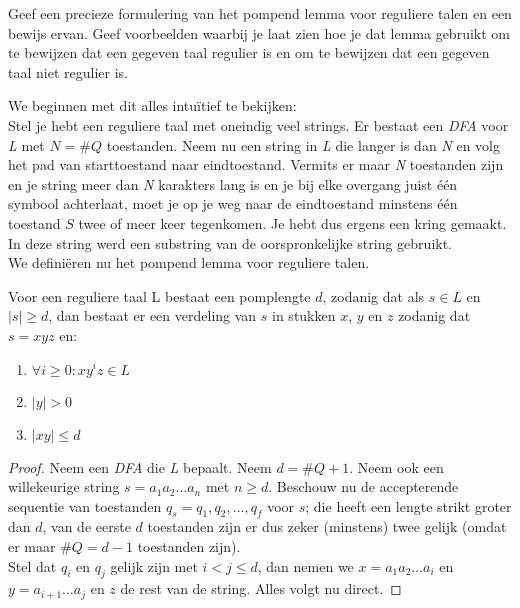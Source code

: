 \begin{quest}
Geef een precieze formulering van het pompend lemma voor reguliere talen en een bewijs ervan. Geef voorbeelden waarbij je laat zien hoe je dat lemma gebruikt om te bewijzen dat een gegeven taal regulier is en om te bewijzen dat een gegeven taal niet regulier is.
\end{quest}

We beginnen met dit alles intu\"itief te bekijken:\\
Stel je hebt een reguliere taal met oneindig veel strings. Er bestaat een \emph{DFA} voor \emph{L} met $N = \#Q$ toestanden. Neem nu een string in \emph{L} die langer is dan \emph{N} en volg het pad van starttoestand naar eindtoestand. Vermits er maar \emph{N} toestanden zijn en je string meer dan \emph{N} karakters lang is en je bij elke overgang juist \'e\'en symbool achterlaat, moet je op je weg naar de eindtoestand minstens \'e\'en toestand $S$ twee of meer keer tegenkomen. Je hebt dus ergens een kring gemaakt. In deze string werd een substring van de oorspronkelijke string gebruikt.\\
We defini\"eren nu het pompend lemma voor reguliere talen.

\begin{theorem}
Voor een reguliere taal L bestaat een pomplengte $d$, zodanig dat als $s \in L$ en $|s| \geq d$, dan bestaat er een verdeling van $s$ in stukken $x$, $y$ en $z$ zodanig dat $s = xyz$ en:
\begin{enumerate}
\item $\forall i \geq 0 : xy^iz \in L$
\item $|y| > 0$
\item $|xy| \leq d$
\end{enumerate}
\end{theorem}

\begin{proof}
Neem een \emph{DFA} die \emph{L} bepaalt. Neem $d=\#Q+1$. Neem ook een willekeurige string $s = a_1a_2 \hdots a_n$ met $n \geq d$. Beschouw nu de accepterende sequentie van toestanden $q_s = q_1,q_2,\hdots,q_f$ voor $s$; die heeft een lengte strikt groter dan $d$, van de eerste $d$ toestanden zijn er dus zeker (minstens) twee gelijk (omdat er maar $\#Q = d-1$ toestanden zijn).\\

Stel dat $q_i$ en $q_j$ gelijk zijn met $i<j \leq d$, dan nemen we $x=a_1a_2\hdots a_i$ en $y=a_{i+1} \hdots a_j$ en $z$ de rest van de string. Alles volgt nu direct.
\end{proof}

